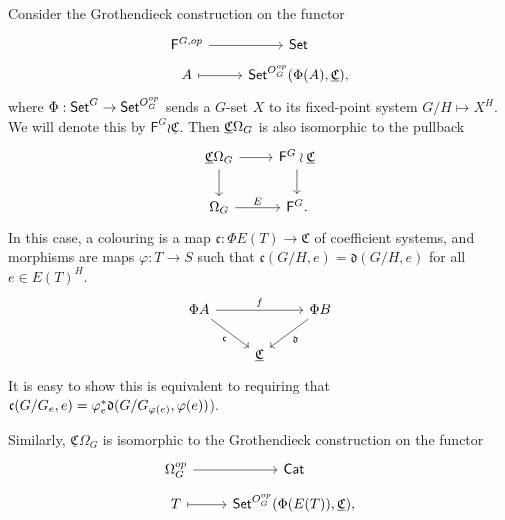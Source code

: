 \documentclass[psamsfonts,onesided,10pt
,draft
]{amsart}%
\renewcommand{\phi}{\varphi}
\begin{document}
\begin{remark}
      Consider the Grothendieck construction on the functor
      \begin{equation}
            \begin{tikzcd}[row sep = tiny]
                  \mathsf F^{G,op} \arrow[r]
                  &
                  \mathsf{Set}
                  \\
                  A \arrow[r, mapsto]
                  &
                  \Set^{O_G^{op}}(\Phi(A), \underline{\mathfrak C}),
            \end{tikzcd}
      \end{equation}
      where $\Phi: \mathsf{Set}^G \to \mathsf{Set}^{O_G^{op}}$ sends a $G$-set $X$ to its fixed-point system $G/H \mapsto X^H$.
      We will denote this by $\mathsf F^G \wr \underline{\mathfrak C}$.
      Then $\underline{\mathfrak C} \Omega_G$ is also isomorphic to the pullback
      \begin{equation}
            \begin{tikzcd}
                  \CO \arrow[d] \arrow[r]
                  &
                  \mathsf F^G \wr \underline{\mathfrak C} \arrow[d]
                  \\
                  \Omega_G \arrow[r, "E"]
                  &
                  \mathsf F^G.
            \end{tikzcd}
      \end{equation}
      In this case, a colouring is a map $\mathfrak c: \Phi E(T) \to \mathfrak C$ of coefficient systems,
      and morphisms are maps $\phi: T \to S$ such that
      $\mathfrak c(G/H,e) = \mathfrak d(G/H,e)$ for all $e \in E(T)^H$.
      \begin{equation}
            \begin{tikzcd}
                  \Phi A \arrow[rr, "f"] \arrow[dr, "\mathfrak c"']
                  &&
                  \Phi B \arrow[dl, "\mathfrak d"]
                  \\
                  &
                  \underline{\mathfrak C}
            \end{tikzcd}
      \end{equation}
      It is easy to show this is equivalent to requiring that $\mathfrak c(G/G_e,e) = \phi_e^{\**} \mathfrak d(G/G_{\phi(e)}, \phi(e))$).
      
      Similarly, $\underline{\mathfrak C}\Omega_G$ is isomorphic to the Grothendieck construction on the functor
      \begin{equation}
            \begin{tikzcd}[row sep = tiny]
                  \Omega_G^{op} \arrow[r]
                  &
                  \mathsf{Cat}
                  \\
                  T \arrow[r, mapsto]
                  &
                  \Set^{O_G^{op}}(\Phi(E(T)), \underline{\mathfrak C}),
              \end{tikzcd}
        \end{equation}


\end{remark}
\end{document}
